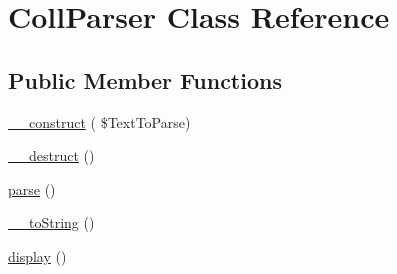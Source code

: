 \hypertarget{class_coll_parser}{}\section{Coll\+Parser Class Reference}
\label{class_coll_parser}
\subsection*{Public Member Functions}
\begin{DoxyCompactItemize}
\item 
\hyperlink{class_coll_parser_a0642e6816338ececb86de51a3458a2a9}{\+\_\+\+\_\+construct} ( \$Text\+To\+Parse)
\item 
\hyperlink{class_coll_parser_a247899e603dc8e17fb15060498eadcca}{\+\_\+\+\_\+destruct} ()
\item 
\hyperlink{class_coll_parser_abdc6979cbc41f9b90e1cf6602d95cefa}{parse} ()
\item 
\hyperlink{class_coll_parser_a66f8bad86783c3224b7e94f5736f691e}{\+\_\+\+\_\+to\+String} ()
\item 
\hyperlink{class_coll_parser_a80c4fddf08335fdffd0db37a432dce7b}{display} ()
\end{DoxyCompactItemize}
